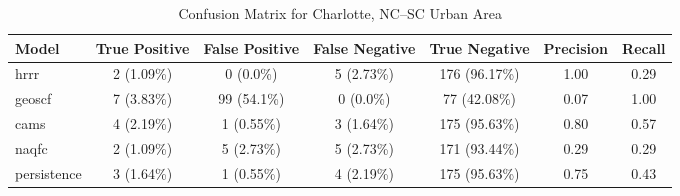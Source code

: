 \begin{table}[h!]
\centering
\begin{tabular}{lcccccc}
\hline
Model & True Positive & False Positive & False Negative & True Negative & Precision & Recall\\ \hline
hrrr & 2 (1.09\%) & 0 (0.0\%) & 5 (2.73\%) & 176 (96.17\%) & \cellcolor{green!25}1.00 & \cellcolor{red!25}0.29 \\ 
geoscf & 7 (3.83\%) & 99 (54.1\%) & 0 (0.0\%) & 77 (42.08\%) & \cellcolor{red!25}0.07 & \cellcolor{green!25}1.00 \\ 
cams & 4 (2.19\%) & 1 (0.55\%) & 3 (1.64\%) & 175 (95.63\%) & \cellcolor{green!25}0.80 & \cellcolor{green!25}0.57 \\ 
naqfc & 2 (1.09\%) & 5 (2.73\%) & 5 (2.73\%) & 171 (93.44\%) & \cellcolor{red!25}0.29 & \cellcolor{red!25}0.29 \\ 
persistence & 3 (1.64\%) & 1 (0.55\%) & 4 (2.19\%) & 175 (95.63\%) & 0.75 & 0.43 \\ 
\hline
\end{tabular}
\caption{Confusion Matrix for Charlotte, NC--SC Urban Area}
\end{table}
